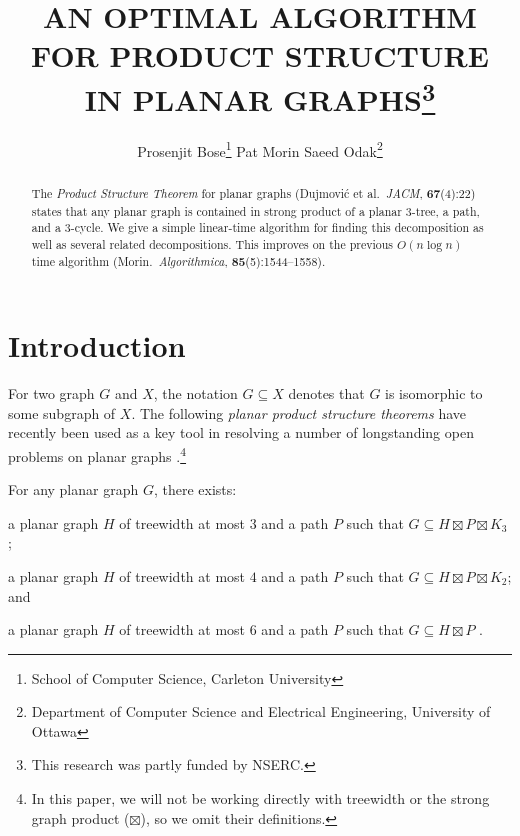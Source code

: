 \documentclass{patmorin}
\title{\MakeUppercase{An Optimal Algorithm for Product Structure in Planar Graphs}\thanks{This research was partly funded by NSERC.}}
\author{%
  Prosenjit Bose\thanks{School of Computer Science, Carleton University}\qquad
  Pat Morin\footnotemark[1]\qquad
  Saeed Odak\thanks{Department of Computer Science and Electrical Engineering, University of Ottawa}}
\date{}
\begin{document}
\maketitle

\begin{abstract}
  The \emph{Product Structure Theorem} for planar graphs (Dujmović et al.\ \emph{JACM}, \textbf{67}(4):22) states that any planar graph is contained in strong product of a planar $3$-tree, a path, and a $3$-cycle.  We give a simple linear-time algorithm for finding this decomposition as well as several related decompositions.  This improves on the previous $O(n\log n)$ time algorithm (Morin.\ \emph{Algorithmica}, \textbf{85}(5):1544--1558).
\end{abstract}

%

\section{Introduction}

For two graph $G$ and $X$, the notation $G\subseteq X$ denotes that $G$ is isomorphic to some subgraph of $X$.
The following \emph{planar product structure theorems} have recently been used as a key tool in resolving a number of longstanding open problems on planar graphs \cite{dujmovic.esperet.ea:adjacency,dujmovic.joret.ea:planar,dujmovic.esperet.ea:planar,debski.felsner.ea:improved}.\footnote{In this paper, we will not be working directly with treewidth or the strong graph product ($\boxtimes$), so we omit their definitions.}


\begin{thm}\label{meta}
  For any planar graph $G$, there exists:
  \begin{compactenum}[(a)]
    \item \label{three_tree} a planar graph $H$ of treewidth at most $3$ and a path $P$ such that $G\subseteq H\boxtimes P\boxtimes K_3$ \cite{dujmovic.joret.ea:planar};
    \item \label{four_tree} a planar graph $H$ of treewidth at most $4$ and a path $P$ such that $G\subseteq H\boxtimes P\boxtimes K_2$; and
    \item \label{six_tree} a planar graph $H$ of treewidth at most $6$ and a path $P$ such that $G\subseteq H\boxtimes P$ \cite{ueckerdt.wood.ea:improved}.
  \end{compactenum}
\end{thm}
\end{document}
